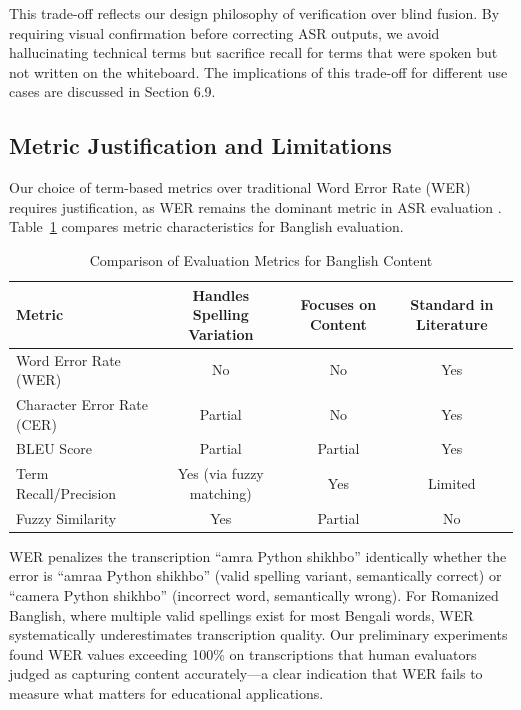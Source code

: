 This trade-off reflects our design philosophy of verification over blind fusion. By requiring visual confirmation before correcting ASR outputs, we avoid hallucinating technical terms but sacrifice recall for terms that were spoken but not written on the whiteboard. The implications of this trade-off for different use cases are discussed in Section 6.9.

\subsection{Metric Justification and Limitations}

Our choice of term-based metrics over traditional Word Error Rate (WER) requires justification, as WER remains the dominant metric in ASR evaluation \cite{Jurafsky2000}. Table~\ref{tab:metric_comparison} compares metric characteristics for Banglish evaluation.

\begin{table}[h]
\centering
\caption{Comparison of Evaluation Metrics for Banglish Content}
\label{tab:metric_comparison}
\begin{tabular}{|l|c|c|c|}
\hline
\textbf{Metric} & \textbf{Handles Spelling Variation} & \textbf{Focuses on Content} & \textbf{Standard in Literature} \\
\hline
Word Error Rate (WER) & No & No & Yes \\
\hline
Character Error Rate (CER) & Partial & No & Yes \\
\hline
BLEU Score & Partial & Partial & Yes \\
\hline
Term Recall/Precision & Yes (via fuzzy matching) & Yes & Limited \\
\hline
Fuzzy Similarity & Yes & Partial & No \\
\hline
\end{tabular}
\end{table}

WER penalizes the transcription ``amra Python shikhbo'' identically whether the error is ``amraa Python shikhbo'' (valid spelling variant, semantically correct) or ``camera Python shikhbo'' (incorrect word, semantically wrong). For Romanized Banglish, where multiple valid spellings exist for most Bengali words, WER systematically underestimates transcription quality. Our preliminary experiments found WER values exceeding 100\% on transcriptions that human evaluators judged as capturing content accurately---a clear indication that WER fails to measure what matters for educational applications.

